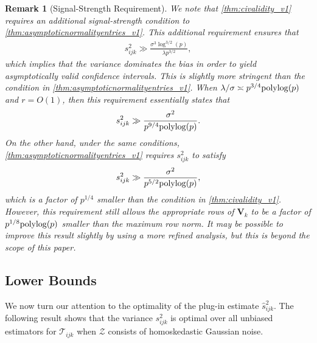 \documentclass[10pt]{article}
\newcommand{\0}{{\mathbf{0}}}
\newcommand{\1}{{\mathbf{1}}}
\newcommand{\polylog}{{\rm polylog}}
\newtheorem{remark}{Remark}
\renewcommand{\hat}{\widehat}
\renewcommand{\hat}{\widehat}
\begin{document}
\begin{remark}[Signal-Strength Requirement] %
We note that \cref{thm:civalidity_v1} requires an additional signal-strength condition to \cref{thm:asymptoticnormalityentries_v1}. This additional requirement ensures that
\begin{align*}
    s^2_{ijk} \gg \frac{\sigma^3  \log^{3/2}(p)}{\lambda p^{3/2}},
\end{align*}
which implies that the variance dominates the bias in order to yield asymptotically valid confidence intervals. This is slightly more stringent than the condition in \cref{thm:asymptoticnormalityentries_v1}.  When $\lambda/\sigma \asymp p^{3/4} \polylog(p)$ and $r = O(1)$, then this requirement essentially states that
\begin{align*}
    s^2_{ijk} \gg \frac{\sigma^2}{p^{9/4}\polylog(p)}.
\end{align*}
On the other hand, under the same conditions, \cref{thm:asymptoticnormalityentries_v1} requires $s^2_{ijk}$ to satisfy
\begin{align*}
    s^2_{ijk} \gg \frac{\sigma^2}{p^{5/2} \polylog(p)},
\end{align*}
which is a factor of $p^{1/4}$ smaller than the condition in \cref{thm:civalidity_v1}.  However, this requirement still allows the appropriate rows of $\mathbf{V}_k$ to be a factor of $p^{1/8}\polylog(p)$ smaller than the maximum row norm.  %
It may be possible to improve this result slightly by using a more refined analysis, %
but this is beyond the scope of this paper.
\end{remark}

    
    \subsection{Lower Bounds}
    \label{sec:entrylowerbounds}
    
We now turn our attention to the optimality of the plug-in estimate $\hat s^2_{ijk}$.  The following result shows that the variance $s^2_{ijk}$ is optimal over all unbiased estimators for $\mathcal{T}_{ijk}$ when $\mathcal{Z}$ consists of homoskedastic Gaussian noise.
\end{document}
